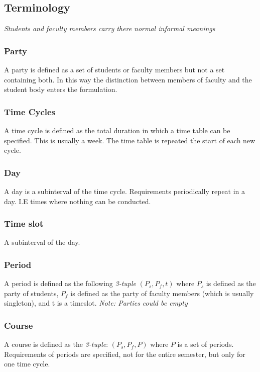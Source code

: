 \documentclass[11pt]{book}
\begin{document}
\subsection{Terminology}

\textit{Students and faculty members carry there normal informal meanings}

\subsubsection{Party}
A party is defined as a set of students or faculty members but not a set containing both. In this way the distinction between members of faculty and the student body enters the formulation.

\subsubsection{Time Cycles}
A time cycle is defined as the total duration in which a time table can be specified. This is usually a week. The time table is repeated the start of each new cycle.

\subsubsection{Day}
A day is a subinterval of the time cycle. Requirements periodically repeat in a day. I.E times where nothing can be conducted.

\subsubsection{Time slot}
A subinterval of the day.

\subsubsection{Period}
A period is defined as the following \textit{3-tuple} $(P_s, P_f, t)$ where $P_s$ is defined as the party of students, $P_f$ is defined as the party of faculty members (which is usually singleton), and t is a timeslot. \textit{Note: Parties could be empty}

\subsubsection{Course}
A course is defined as the \textit{3-tuple}: $({P_s}, {P_f}, P)$ where $P$ is a set of periods. Requirements of periods are specified, not for the entire semester, but only for one time cycle.
\end{document}
